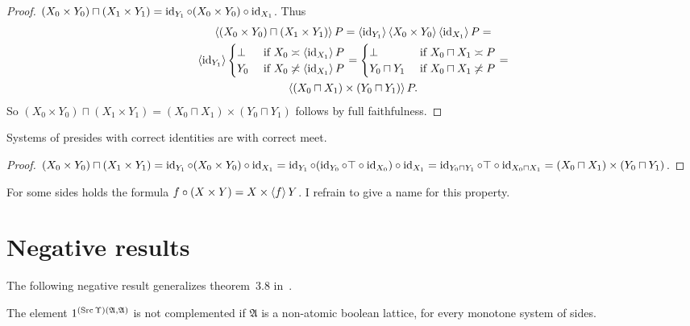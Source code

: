 \begin{proof}
$(X_0\times Y_0)\sqcap(X_1\times Y_1) = \operatorname{id}_{Y_1}\circ(X_0\times Y_0)\circ\operatorname{id}_{X_1}$.
Thus
\begin{multline*}
\left\langle (X_0\times Y_0)\sqcap(X_1\times Y_1)\right\rangle P = \left\langle \operatorname{id}_{Y_1}\right\rangle\left\langle X_0\times Y_0\right\rangle\left\langle \operatorname{id}_{X_1}\right\rangle P = \\
\left\langle \operatorname{id}_{Y_1}\right\rangle\begin{cases}\bot&\text{ if }X_0\asymp\left\langle \operatorname{id}_{X_1}\right\rangle P\\Y_0&\text{ if }X_0\not\asymp\left\langle \operatorname{id}_{X_1}\right\rangle P\end{cases} =
\begin{cases}\bot&\text{ if }X_0\sqcap X_1\asymp P\\Y_0\sqcap Y_1&\text{ if }X_0\sqcap X_1\not\asymp P\end{cases} = \\
\left\langle (X_0\sqcap X_1)\times(Y_0\sqcap Y_1)\right\rangle P.
\end{multline*}
So $(X_0\times Y_0)\sqcap(X_1\times Y_1) = (X_0\sqcap X_1)\times(Y_0\sqcap Y_1)$ follows by full faithfulness.
\end{proof}

\begin{prop}
Systems of presides with correct identities are with correct meet.
\end{prop}

\begin{proof}
$(X_0 \times Y_0) \sqcap (X_1 \times Y_1) = \operatorname{id}_{Y_1} \circ (X_0 \times
Y_0) \circ \operatorname{id}_{X_1} = \operatorname{id}_{Y_1} \circ (\operatorname{id}_{Y_0} \circ \top
\circ \operatorname{id}_{X_0}) \circ \operatorname{id}_{X_1} = \operatorname{id}_{Y_0 \sqcap Y_1}
\circ \top \circ \operatorname{id}_{X_0 \sqcap X_1} = (X_0 \sqcap X_1) \times (Y_0
\sqcap Y_1)$.
\end{proof}

For some sides holds the formula $f\circ(X\times Y) = X\times\left\langle f\right\rangle Y$.
I refrain to give a name for this property.

\section{Negative results}

The following negative result generalizes theorem~3.8 in~\cite{tprod-dist-lat}.

\begin{thm}\label{neg-prod}
  The element $1^{(\operatorname{Src}\Upsilon)(\mathfrak{A}, \mathfrak{A})}$ is not
  complemented if $\mathfrak{A}$ is a non-atomic boolean lattice,
  for every monotone system of sides.
\end{thm}

